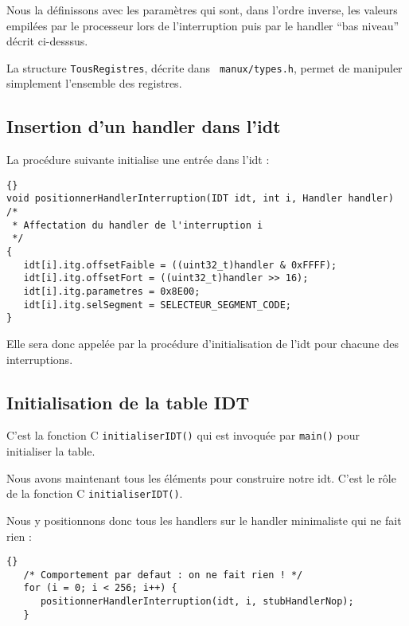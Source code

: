 \begin{itemize}
   Nous la définissons avec les paramètres qui sont, dans l'ordre
inverse, les valeurs empilées par le processeur lors de l'interruption
puis par le handler ``bas niveau'' décrit ci-desssus.

   La structure \lstinline!TousRegistres!, décrite dans {\tt
manux/types.h}, permet de manipuler simplement l'ensemble des
registres.
   
%      
\subsection{Insertion d'un handler dans l'{\sc idt}}

   La procédure suivante initialise une entrée dans l'{\sc idt} :

\begin{lstlisting}{}
void positionnerHandlerInterruption(IDT idt, int i, Handler handler)
/*
 * Affectation du handler de l'interruption i
 */
{
   idt[i].itg.offsetFaible = ((uint32_t)handler & 0xFFFF);
   idt[i].itg.offsetFort = ((uint32_t)handler >> 16);
   idt[i].itg.parametres = 0x8E00;
   idt[i].itg.selSegment = SELECTEUR_SEGMENT_CODE;
}

\end{lstlisting}

   Elle sera donc appelée par la procédure d'initialisation de l'{\sc idt} pour
chacune des interruptions.

\subsection{Initialisation de la table IDT}

   C'est la fonction C \lstinline!initialiserIDT()! qui est invoquée
par \lstinline!main()! pour initialiser la table.
   
   Nous avons maintenant tous les éléments pour construire notre {\sc
idt}. C'est le rôle de la fonction C \lstinline!initialiserIDT()!.
   
   Nous y positionnons donc tous les handlers sur le handler minimaliste
qui ne fait rien :

\begin{lstlisting}{}
   /* Comportement par defaut : on ne fait rien ! */
   for (i = 0; i < 256; i++) {
      positionnerHandlerInterruption(idt, i, stubHandlerNop);
   }
\end{lstlisting}


\end{itemize}
